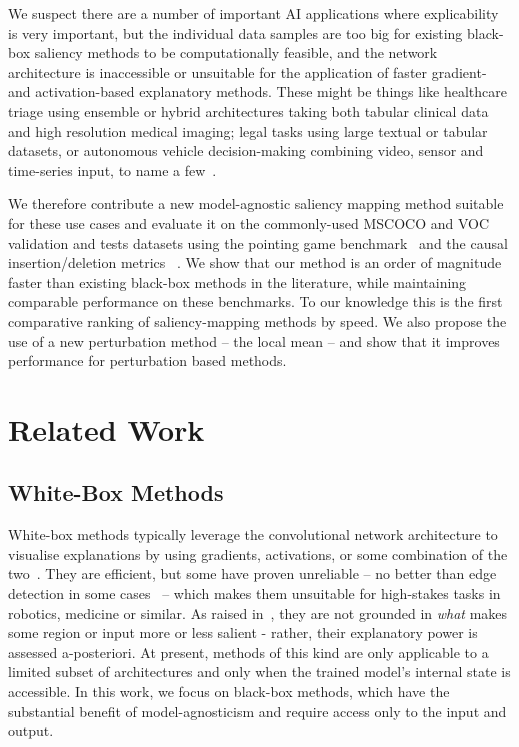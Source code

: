 \documentclass{article} %
\begin{document}
We suspect there are a number of important AI applications where explicability is very important, but the individual data samples are too big for existing black-box saliency methods to be computationally feasible, and the network architecture is inaccessible or unsuitable for the application of faster gradient- and activation-based explanatory methods. These might be things like healthcare triage using ensemble or hybrid architectures taking both tabular clinical data and high resolution medical imaging; legal tasks using large textual or tabular datasets, or autonomous vehicle decision-making combining video, sensor and time-series input, to name a few~\cite{Tuckey2019-uj, Manikandan2020-yw}.

We therefore contribute a new model-agnostic saliency mapping method suitable for these use cases and evaluate it on the commonly-used MSCOCO and VOC validation and tests datasets using the pointing game benchmark~\cite{} and the causal insertion/deletion metrics ~\cite{Petsiuk2018-wx}. We show that our method is an order of magnitude faster than existing black-box methods in the literature, while maintaining comparable performance on these benchmarks. To our knowledge this is the first comparative ranking of saliency-mapping methods by speed. We also propose the use of a new perturbation method -- the local mean -- and show that it improves performance for perturbation based methods.

\section{Related Work}

\subsection{White-Box Methods}

White-box methods typically leverage the convolutional network architecture to visualise explanations by using gradients, activations, or some combination of the two~\cite{Selvaraju2016-vq, Simonyan2013-rl, Zhang2016-vm, Mahendran2016-hf, Zhang2016-vm}. They are efficient, but some have proven unreliable -- no better than edge detection in some cases~\cite{Adebayo2018-om, Schneider2020-jx} -- which makes them unsuitable for high-stakes tasks in robotics, medicine or similar. As raised in~\cite{Fong2019-vk}, they are not grounded in \emph{what} makes some region or input more or less salient - rather, their explanatory power is assessed a-posteriori. At present, methods of this kind are only applicable to a limited subset of architectures and only when the trained model's internal state is accessible. In this work, we focus on black-box methods, which have the substantial benefit of model-agnosticism and require access only to the input and output. 
\end{document}
